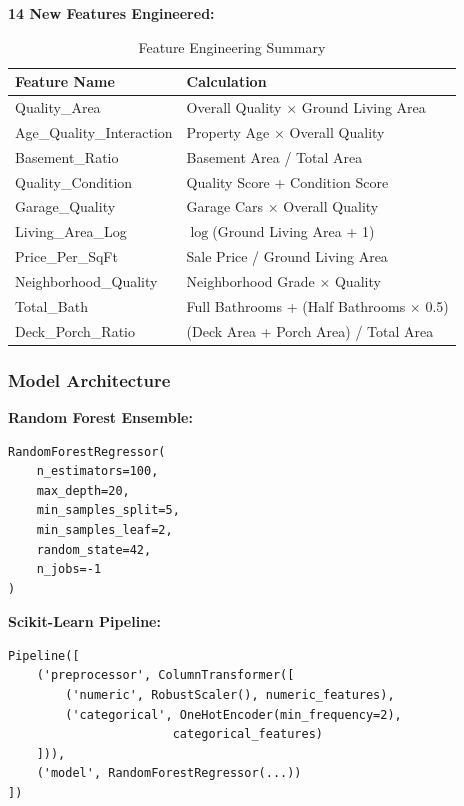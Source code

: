 \documentclass[11pt,a4paper]{article}
\begin{document}
\textbf{14 New Features Engineered:}

\begin{table}[h!]
    \centering
    \small
    \begin{tabular}{lp{6cm}}
        \toprule
        \textbf{Feature Name} & \textbf{Calculation} \\
        \midrule
        Quality\_Area & Overall Quality $\times$ Ground Living Area \\
        Age\_Quality\_Interaction & Property Age $\times$ Overall Quality \\
        Basement\_Ratio & Basement Area / Total Area \\
        Quality\_Condition & Quality Score + Condition Score \\
        Garage\_Quality & Garage Cars $\times$ Overall Quality \\
        Living\_Area\_Log & $\log$(Ground Living Area + 1) \\
        Price\_Per\_SqFt & Sale Price / Ground Living Area \\
        Neighborhood\_Quality & Neighborhood Grade $\times$ Quality \\
        Total\_Bath & Full Bathrooms + (Half Bathrooms $\times$ 0.5) \\
        Deck\_Porch\_Ratio & (Deck Area + Porch Area) / Total Area \\
        \bottomrule
    \end{tabular}
    \caption{Feature Engineering Summary}
\end{table}

\subsubsection{Model Architecture}

\textbf{Random Forest Ensemble:}

\begin{lstlisting}
RandomForestRegressor(
    n_estimators=100,
    max_depth=20,
    min_samples_split=5,
    min_samples_leaf=2,
    random_state=42,
    n_jobs=-1
)
\end{lstlisting}

\textbf{Scikit-Learn Pipeline:}

\begin{lstlisting}
Pipeline([
    ('preprocessor', ColumnTransformer([
        ('numeric', RobustScaler(), numeric_features),
        ('categorical', OneHotEncoder(min_frequency=2), 
                       categorical_features)
    ])),
    ('model', RandomForestRegressor(...))
])
\end{lstlisting}
\end{document}
